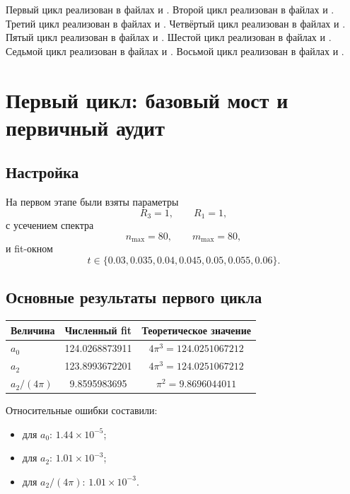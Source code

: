\documentclass[12pt,a4paper]{article}
\begin{document}
Первый цикл реализован в файлах  и . Второй цикл реализован в файлах  и . Третий цикл реализован в файлах  и . Четвёртый цикл реализован в файлах  и . Пятый цикл реализован в файлах  и . Шестой цикл реализован в файлах  и . Седьмой цикл реализован в файлах  и . Восьмой цикл реализован в файлах  и .

\section{Первый цикл: базовый мост и первичный аудит}

\subsection{Настройка}

На первом этапе были взяты параметры
\[
R_3=1,\qquad R_1=1,
\]
с усечением спектра
\[
n_{\max}=80,\qquad m_{\max}=80,
\]
и fit-окном
\[
t\in\{0.03,0.035,0.04,0.045,0.05,0.055,0.06\}.
\]

\subsection{Основные результаты первого цикла}

\begin{center}
\begin{tabular}{lcc}
\toprule
Величина & Численный fit & Теоретическое значение \\
\midrule
$a_0$ & 124.0268873911 & $4\pi^3 = 124.0251067212$ \\
$a_2$ & 123.8993672201 & $4\pi^3 = 124.0251067212$ \\
$a_2/(4\pi)$ & 9.8595983695 & $\pi^2 = 9.8696044011$ \\
\bottomrule
\end{tabular}
\end{center}

Относительные ошибки составили:
\begin{itemize}
    \item для \(a_0\): \(1.44\times 10^{-5}\);
    \item для \(a_2\): \(1.01\times 10^{-3}\);
    \item для \(a_2/(4\pi)\): \(1.01\times 10^{-3}\).
\end{itemize}
\end{document}
